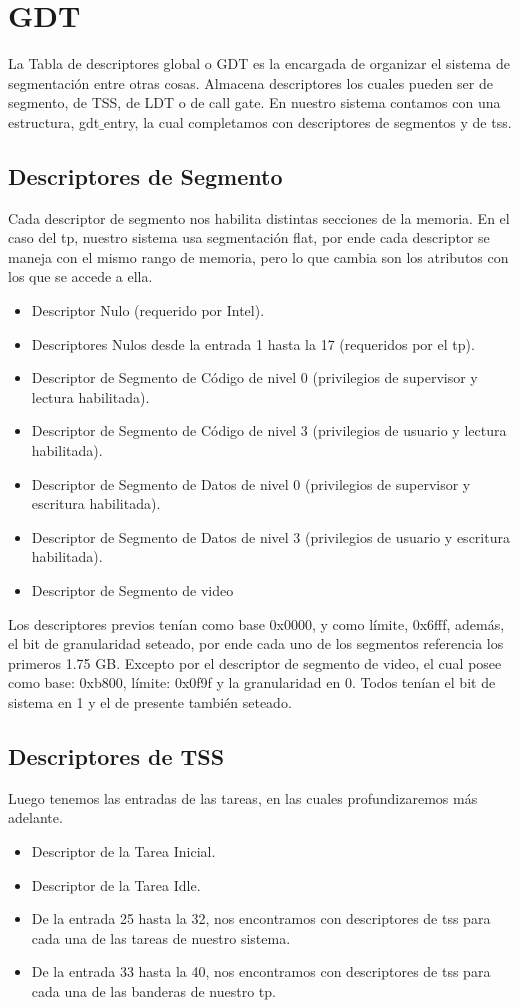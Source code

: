 
\section{GDT}
\par{La Tabla de descriptores global o GDT es la encargada de organizar el sistema de segmentación entre otras cosas. Almacena descriptores los cuales pueden ser de segmento, de TSS, de LDT o de call gate. En nuestro sistema contamos con una estructura, gdt$\_$entry, la cual completamos con descriptores de segmentos y de tss.}
\subsection{Descriptores de Segmento}
\par{
Cada descriptor de segmento nos habilita distintas secciones de la memoria. En el caso del tp, nuestro sistema usa segmentación flat, por ende cada descriptor se maneja con el mismo rango de memoria, pero lo que cambia son los atributos con los que se accede a ella.
\begin{itemize}
\item Descriptor Nulo (requerido por Intel).
\item Descriptores Nulos desde la entrada 1 hasta la 17 (requeridos por el tp).
\item Descriptor de Segmento de Código de nivel 0 (privilegios de supervisor y lectura habilitada).
\item Descriptor de Segmento de Código de nivel 3 (privilegios de usuario y lectura habilitada).
\item Descriptor de Segmento de Datos de nivel 0 (privilegios de supervisor y escritura habilitada).
\item Descriptor de Segmento de Datos de nivel 3 (privilegios de usuario y escritura habilitada).
\item Descriptor de Segmento de video 
\end{itemize}
\medskip
\par{Los descriptores previos tenían como base 0x0000, y como límite, 0x6fff, además, el bit de granularidad seteado, por ende cada uno de los segmentos referencia los primeros 1.75 GB. Excepto por el descriptor de segmento de video, el cual posee como base: 0xb800, límite: 0x0f9f y la granularidad en 0.
Todos tenían el bit de sistema en 1 y el de presente también seteado.
}
\medskip

\subsection{Descriptores de TSS}
Luego tenemos las entradas de las tareas, en las cuales profundizaremos más adelante.
\begin{itemize}
\item Descriptor de la Tarea Inicial.
\item Descriptor de la Tarea Idle.
\item De la entrada 25 hasta la 32, nos encontramos con descriptores de tss para cada una de las tareas de nuestro sistema.
\item De la entrada 33 hasta la 40, nos encontramos con descriptores de tss para cada una de las banderas de nuestro tp.
\end{itemize}


}
